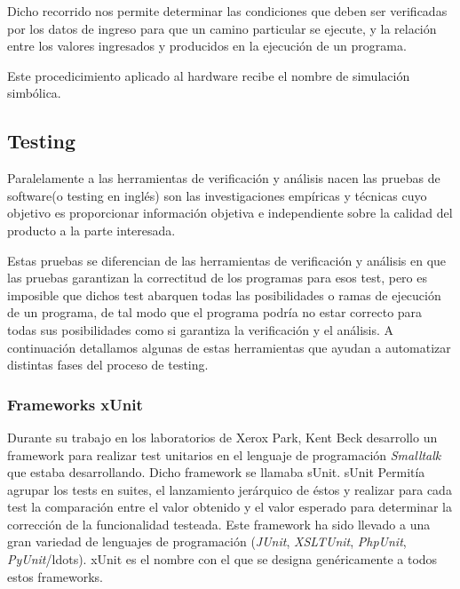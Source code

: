 Dicho recorrido nos permite determinar las condiciones que deben ser verificadas por los datos de ingreso para que un camino particular se ejecute, y la relaci\'on entre los valores ingresados y producidos en la ejecuci\'on de un programa. 

Este procedicimiento aplicado al hardware recibe el nombre de simulaci\'on simb\'olica.


\subsection{Testing}

Paralelamente a las herramientas de verificaci\'on y an\'alisis nacen las pruebas de software(o testing en ingl\'es) son las investigaciones emp\'iricas y t\'ecnicas cuyo objetivo es proporcionar informaci\'on objetiva e independiente sobre la calidad del producto a la parte interesada.

Estas pruebas se diferencian de las herramientas de verificaci\'on y an\'alisis en que las pruebas garantizan la correctitud de los programas para esos test, pero es imposible que dichos test abarquen todas las posibilidades o ramas de ejecuci\'on de un programa, de tal modo que el programa podr\'ia no estar correcto para todas sus posibilidades como si garantiza la verificaci\'on y el an\'alisis. A continuaci\'on detallamos algunas de estas herramientas que ayudan a automatizar distintas fases del proceso de testing.

\subsubsection*{Frameworks xUnit}

Durante su trabajo en los laboratorios de Xerox Park, Kent Beck desarrollo un framework para realizar test unitarios en el lenguaje de programaci\'on {\it Smalltalk} que estaba desarrollando. Dicho framework se llamaba sUnit. sUnit Permit\'ia agrupar los tests en suites, el lanzamiento jer\'arquico de \'estos y realizar para cada test la comparaci\'on entre el valor obtenido y el valor esperado para determinar la correcci\'on de la funcionalidad testeada. Este framework ha sido llevado a una gran variedad de lenguajes de programaci\'on ({\it JUnit}, {\it XSLTUnit}, {\it PhpUnit}, {\it PyUnit}/ldots). xUnit es el nombre con el que se designa gen\'ericamente a todos estos frameworks.

